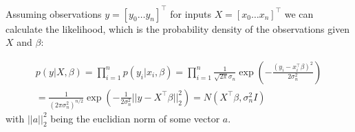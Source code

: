 Assuming observations $y = [y_0 \dots y_n]^{\top}$ for inputs $X = [x_0 \dots x_n]^{\top}$
we can calculate the likelihood,
which is the probability density of the observations given $X$ and $\beta$:

\begin{gather*}
    p(y|X,\beta) = \prod_{i=1}^{n}p(y_i|x_i, \beta) = \prod_{i=1}^{n}\frac{1}{\sqrt {2\pi}\sigma_n}
    \exp(-\frac{ (y_i- x_i^{\top}\beta)^{2}}{2 \sigma_n^2}) \\
    = \frac{1}{(2 \pi \sigma_n^2)^{n/2}} \exp(-\frac{1}{2\sigma_n^2}
    ||y-X^{\top}\beta||_2^2) = N(X^{\top} \beta, \sigma_n^2 I)
\end{gather*}
with $||a||_2^2$ being the euclidian norm of some vector $a$.




